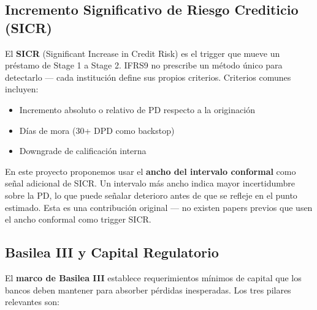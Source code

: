 \documentclass[
  spanish,
  11pt,
  letterpaper,
]{scrbook}
\providecommand{\tightlist}{%
  \setlength{\itemsep}{0pt}\setlength{\parskip}{0pt}}
\theoremstyle{plain}
\theoremstyle{remark}
\begin{document}
\subsection{Incremento Significativo de Riesgo Crediticio
(SICR)}\label{incremento-significativo-de-riesgo-crediticio-sicr}

El \textbf{SICR} (Significant Increase in Credit Risk) es el trigger que
mueve un préstamo de Stage 1 a Stage 2. IFRS9 no prescribe un método
único para detectarlo --- cada institución define sus propios criterios.
Criterios comunes incluyen:

\begin{itemize}
\tightlist
\item
  Incremento absoluto o relativo de PD respecto a la originación
\item
  Días de mora (30+ DPD como backstop)
\item
  Downgrade de calificación interna
\end{itemize}

\begin{tcolorbox}[enhanced jigsaw, arc=.35mm, bottomrule=.15mm, bottomtitle=1mm, breakable, colback=white, colbacktitle=quarto-callout-tip-color!10!white, colframe=quarto-callout-tip-color-frame, coltitle=black, left=2mm, leftrule=.75mm, opacityback=0, opacitybacktitle=0.6, rightrule=.15mm, title=\textcolor{quarto-callout-tip-color}{\faLightbulb}\hspace{0.5em}{Innovación del proyecto}, titlerule=0mm, toprule=.15mm, toptitle=1mm]

En este proyecto proponemos usar el \textbf{ancho del intervalo
conformal} como señal adicional de SICR. Un intervalo más ancho indica
mayor incertidumbre sobre la PD, lo que puede señalar deterioro antes de
que se refleje en el punto estimado. Esta es una contribución original
--- no existen papers previos que usen el ancho conformal como trigger
SICR.

\end{tcolorbox}

\subsection{Basilea III y Capital
Regulatorio}\label{basilea-iii-y-capital-regulatorio}

El \textbf{marco de Basilea III} establece requerimientos mínimos de
capital que los bancos deben mantener para absorber pérdidas
inesperadas. Los tres pilares relevantes son:
\end{document}
